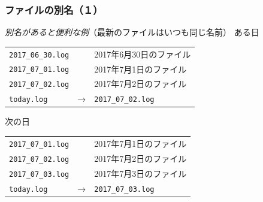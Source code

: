 \documentclass[unicode,handout]{beamer}                   %
\begin{document}
\begin{frame}
  \frametitle{ファイルの別名（１）}
  \emph{別名があると便利な例}（最新のファイルはいつも同じ名前）
  \vfill
  ある日
  \begin{center}
    \begin{tabular}{l c l}
      \texttt{2017\_06\_30.log} &   & 2017年6月30日のファイル \\
      \texttt{2017\_07\_01.log} &   & 2017年7月1日のファイル  \\
      \texttt{2017\_07\_02.log} &   & 2017年7月2日のファイル  \\
      \texttt{today.log}        & → & \texttt{2017\_07\_02.log}
    \end{tabular}
  \end{center}
  \vfill
  次の日
  \begin{center}
    \begin{tabular}{l c l}
      \texttt{2017\_07\_01.log} &   & 2017年7月1日のファイル  \\
      \texttt{2017\_07\_02.log} &   & 2017年7月2日のファイル  \\
      \texttt{2017\_07\_03.log} &   & 2017年7月3日のファイル  \\
      \texttt{today.log}        & → & \texttt{2017\_07\_03.log}
    \end{tabular}
  \end{center}
  \vfill
\end{frame}
\end{document}

